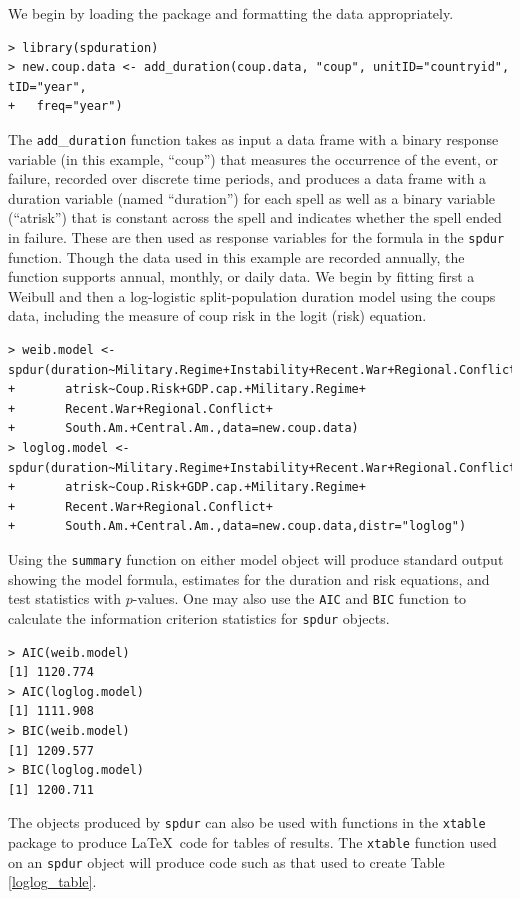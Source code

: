 \documentclass[letter]{article}
\begin{document}
We begin by loading the package and formatting the data appropriately. 
\small
\begin{verbatim}
> library(spduration)
> new.coup.data <- add_duration(coup.data, "coup", unitID="countryid", tID="year", 
+   freq="year")
\end{verbatim}
\normalsize
The \texttt{add}\_\texttt{duration} function takes as input a data frame with a binary response variable (in this example, ``coup'') that measures the occurrence of the event, or failure, recorded over discrete time periods, and produces a data frame with a duration variable (named ``duration'') for each spell as well as a binary variable (``atrisk'') that is constant across the spell and indicates whether the spell ended in failure. These are then used as response variables for the formula in the \texttt{spdur} function. Though the data used in this example are recorded annually, the function supports annual, monthly, or daily data. We begin by fitting first a Weibull and then a log-logistic split-population duration model using the coups data, including the measure of coup risk in the logit (risk) equation. 
\small
\begin{verbatim}
> weib.model <- spdur(duration~Military.Regime+Instability+Recent.War+Regional.Conflict,
+ 	 	atrisk~Coup.Risk+GDP.cap.+Military.Regime+
+ 	 	Recent.War+Regional.Conflict+
+ 	 	South.Am.+Central.Am.,data=new.coup.data)
> loglog.model <- spdur(duration~Military.Regime+Instability+Recent.War+Regional.Conflict,
+  	 	atrisk~Coup.Risk+GDP.cap.+Military.Regime+
+  	 	Recent.War+Regional.Conflict+
+ 	 	South.Am.+Central.Am.,data=new.coup.data,distr="loglog")
\end{verbatim}
\normalsize  
Using the \texttt{summary} function on either model object will produce standard output showing the model formula, estimates for the duration and risk equations, and test statistics with $p$-values. One may also use the \texttt{AIC} and \texttt{BIC} function to calculate the information criterion statistics for \texttt{spdur} objects.  
\small
\begin{verbatim}
> AIC(weib.model)
[1] 1120.774
> AIC(loglog.model)
[1] 1111.908
> BIC(weib.model)
[1] 1209.577
> BIC(loglog.model)
[1] 1200.711
\end{verbatim}
\normalsize
The objects produced by \texttt{spdur} can also be used with functions in the \texttt{xtable} package to produce \LaTeX\ code for tables of results. The \texttt{xtable} function used on an \texttt{spdur} object will produce code such as that used to create Table \ref{loglog_table}. 
\end{document}
